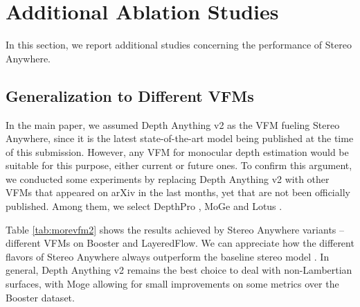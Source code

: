 \documentclass[10pt,twocolumn,letterpaper]{article}
\newcommand{\method}[0]{Stereo Anywhere\xspace}
\begin{document}
\normalsize


\phantom{Invisible Text}
\vspace{-\baselineskip}

\section{Additional Ablation Studies}

\label{sec:ablation}
In this section, we report additional studies concerning the performance of \method.


\phantom{Invisible Text}
\vspace{-\baselineskip}

\subsection{Generalization to Different VFMs}

\label{subsec:ablation_VFM}

In the main paper, we assumed Depth Anything v2 \cite{depth_anything_v2} as the VFM fueling \method, since it is the latest state-of-the-art model being published at the time of this submission.
However, any VFM for monocular depth estimation would be suitable for this purpose, either current or future ones. To confirm this argument, we conducted some experiments by replacing Depth Anything v2 with other VFMs that appeared on arXiv in the last months, yet that are not been officially published. Among them, we select DepthPro \cite{depthpro}, MoGe \cite{wang2024moge} and Lotus \cite{he2024lotus}.

Table \ref{tab:morevfm2} shows the results achieved by \method variants -- different VFMs on Booster and LayeredFlow. We can appreciate how the different flavors of \method always outperform the baseline stereo model \cite{lipson2021raft}. In general, Depth Anything v2 remains the best choice to deal with non-Lambertian surfaces, with Moge allowing for small improvements on some metrics over the Booster dataset.
\end{document}
